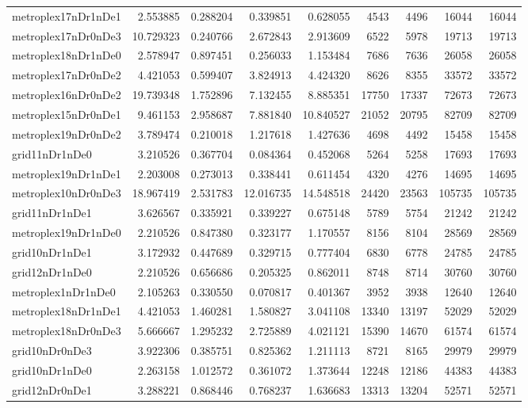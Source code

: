 \begin{longtable}{|l|r|r|r|r|r|r|r|r|}
metroplex17nDr1nDe1 & 2.553885 & 0.288204 & 0.339851 & 0.628055 & 4543 & 4496 & 16044 & 16044 \\
metroplex17nDr0nDe3 & 10.729323 & 0.240766 & 2.672843 & 2.913609 & 6522 & 5978 & 19713 & 19713 \\
metroplex18nDr1nDe0 & 2.578947 & 0.897451 & 0.256033 & 1.153484 & 7686 & 7636 & 26058 & 26058 \\
metroplex17nDr0nDe2 & 4.421053 & 0.599407 & 3.824913 & 4.424320 & 8626 & 8355 & 33572 & 33572 \\
metroplex16nDr0nDe2 & 19.739348 & 1.752896 & 7.132455 & 8.885351 & 17750 & 17337 & 72673 & 72673 \\
metroplex15nDr0nDe1 & 9.461153 & 2.958687 & 7.881840 & 10.840527 & 21052 & 20795 & 82709 & 82709 \\
metroplex19nDr0nDe2 & 3.789474 & 0.210018 & 1.217618 & 1.427636 & 4698 & 4492 & 15458 & 15458 \\
grid11nDr1nDe0 & 3.210526 & 0.367704 & 0.084364 & 0.452068 & 5264 & 5258 & 17693 & 17693 \\
metroplex19nDr1nDe1 & 2.203008 & 0.273013 & 0.338441 & 0.611454 & 4320 & 4276 & 14695 & 14695 \\
metroplex10nDr0nDe3 & 18.967419 & 2.531783 & 12.016735 & 14.548518 & 24420 & 23563 & 105735 & 105735 \\
grid11nDr1nDe1 & 3.626567 & 0.335921 & 0.339227 & 0.675148 & 5789 & 5754 & 21242 & 21242 \\
metroplex19nDr1nDe0 & 2.210526 & 0.847380 & 0.323177 & 1.170557 & 8156 & 8104 & 28569 & 28569 \\
grid10nDr1nDe1 & 3.172932 & 0.447689 & 0.329715 & 0.777404 & 6830 & 6778 & 24785 & 24785 \\
grid12nDr1nDe0 & 2.210526 & 0.656686 & 0.205325 & 0.862011 & 8748 & 8714 & 30760 & 30760 \\
metroplex1nDr1nDe0 & 2.105263 & 0.330550 & 0.070817 & 0.401367 & 3952 & 3938 & 12640 & 12640 \\
metroplex18nDr1nDe1 & 4.421053 & 1.460281 & 1.580827 & 3.041108 & 13340 & 13197 & 52029 & 52029 \\
metroplex18nDr0nDe3 & 5.666667 & 1.295232 & 2.725889 & 4.021121 & 15390 & 14670 & 61574 & 61574 \\
grid10nDr0nDe3 & 3.922306 & 0.385751 & 0.825362 & 1.211113 & 8721 & 8165 & 29979 & 29979 \\
grid10nDr1nDe0 & 2.263158 & 1.012572 & 0.361072 & 1.373644 & 12248 & 12186 & 44383 & 44383 \\
grid12nDr0nDe1 & 3.288221 & 0.868446 & 0.768237 & 1.636683 & 13313 & 13204 & 52571 & 52571 \\

\end{longtable}
